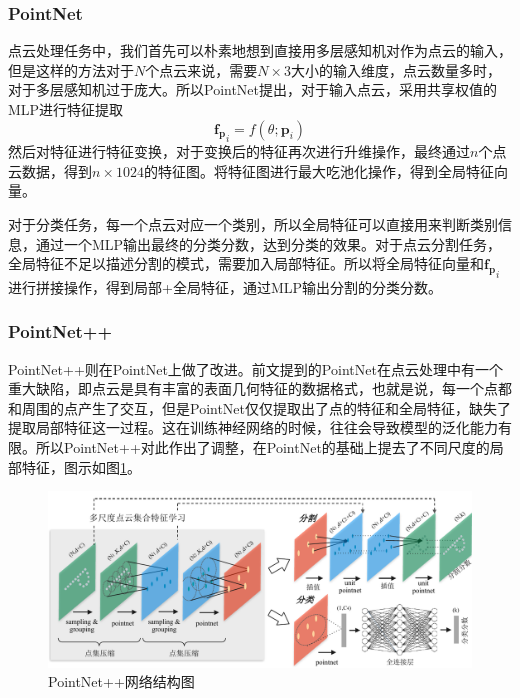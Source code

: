\subsubsection{PointNet}
点云处理任务中，我们首先可以朴素地想到直接用多层感知机\cite{lecun2015deep}对作为点云的输入，但是这样的方法对于$N$个点云来说，需要$N \times 3$大小的输入维度，点云数量多时，对于多层感知机过于庞大。所以PointNet提出，对于输入点云，采用共享权值的MLP进行特征提取
\begin{equation}
    \boldsymbol{f_p}_i = f(\theta; \boldsymbol{p}_i)
\end{equation}
然后对特征进行特征变换，对于变换后的特征再次进行升维操作，最终通过$n$个点云数据，得到$n \times 1024$的特征图。将特征图进行最大吃池化操作，得到全局特征向量。

对于分类任务，每一个点云对应一个类别，所以全局特征可以直接用来判断类别信息，通过一个MLP输出最终的分类分数，达到分类的效果。对于点云分割任务，全局特征不足以描述分割的模式，需要加入局部特征。所以将全局特征向量和$\boldsymbol{f_p}_i$进行拼接操作，得到局部+全局特征，通过MLP输出分割的分类分数。

\subsubsection{PointNet++}
PointNet++\cite{qi2017pointnet++}则在PointNet上做了改进。前文提到的PointNet在点云处理中有一个重大缺陷，即点云是具有丰富的表面几何特征的数据格式，也就是说，每一个点都和周围的点产生了交互，但是PointNet仅仅提取出了点的特征和全局特征，缺失了提取局部特征这一过程。这在训练神经网络的时候，往往会导致模型的泛化能力有限\cite{qi2017pointnet++}。所以PointNet++对此作出了调整，在PointNet的基础上提去了不同尺度的局部特征，图示如图\ref{fig:pointnet++}。

\begin{figure}
    \centering
    \includegraphics[width=\linewidth]{images/pointnet++.pdf}
    \caption{PointNet++\cite{qi2017pointnet++}网络结构图}
    \label{fig:pointnet++}
    \vspace{-5mm}
\end{figure}

